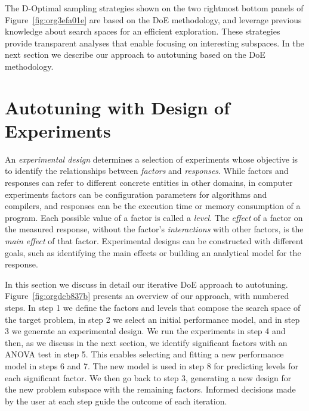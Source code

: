 \documentclass[conference]{IEEEtran}
\begin{document}
The D-Optimal sampling strategies shown on the two rightmost bottom panels of
Figure~\ref{fig:org3efa01e} are based on the DoE methodology, and
leverage previous knowledge about search spaces for an efficient exploration.
These strategies provide transparent analyses that enable focusing on
interesting subspaces. In the next section we describe our approach to
autotuning based on the DoE methodology.
\section{Autotuning with Design of Experiments}
\label{sec:orga0fea60}
An \emph{experimental design} determines a selection of experiments whose objective
is to identify the relationships between \emph{factors} and \emph{responses}. While
factors and responses can refer to different concrete entities in other domains,
in computer experiments factors can be configuration parameters for algorithms
and compilers, and responses can be the execution time or memory consumption of
a program. Each possible value of a factor is called a \emph{level}. The \emph{effect} of
a factor on the measured response, without the factor's \emph{interactions} with
other factors, is the \emph{main effect} of that factor. Experimental designs can be
constructed with different goals, such as identifying the main effects or
building an analytical model for the response.

In this section we discuss in detail our iterative DoE approach to autotuning.
Figure~\ref{fig:orgdcb837b} presents an overview of our approach, with
numbered steps. In step 1 we define the factors and levels that compose the
search space of the target problem, in step 2 we select an initial performance
model, and in step 3 we generate an experimental design. We run the experiments
in step 4 and then, as we discuss in the next section, we identify significant
factors with an ANOVA test in step 5. This enables selecting and fitting a new
performance model in steps 6 and 7. The new model is used in step 8 for
predicting levels for each significant factor. We then go back to step 3,
generating a new design for the new problem subspace with the remaining factors.
Informed decisions made by the user at each step guide the outcome of each
iteration.
\end{document}
